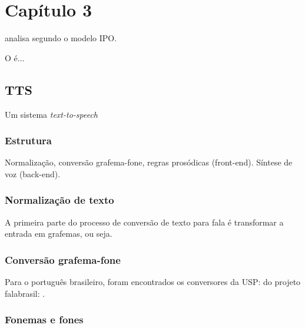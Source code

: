 
\chapter{Capítulo 3}

\cite{ipo} analisa segundo o modelo IPO.

O  é...



\section{TTS}
Um sistema \emph{text-to-speech}
\subsection{Estrutura}
Normalização, conversão grafema-fone, regras prosódicas (front-end).
Síntese de voz (back-end).
\subsection{Normalização de texto}
A primeira parte do processo de conversão de texto para fala é transformar a entrada em grafemas, ou seja.
\subsection{Conversão grafema-fone}
Para o português brasileiro, foram encontrados os conversores
da USP: \cite{g2pusp}
do projeto falabrasil: \cite{falabrasil}.
\subsection{Fonemas e fones}
